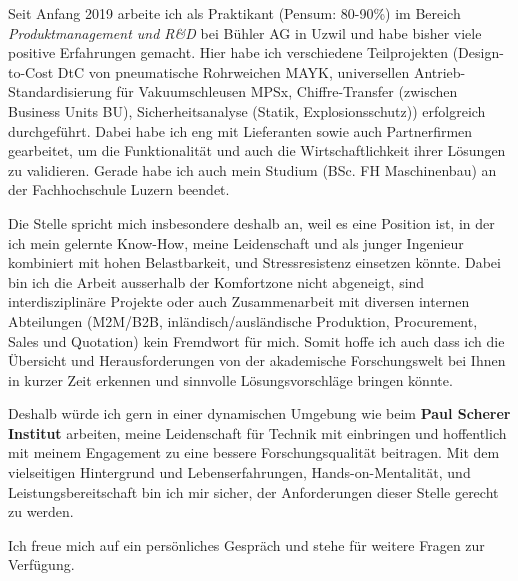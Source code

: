 \documentclass[11pt, a4paper]{awesome-cv}
\newcommand{\companyName}{Paul Scherer Institut}
\begin{document}
\makecvheader

\makelettertitle

\begin{cvletter}
	
Seit Anfang 2019 arbeite ich als Praktikant (Pensum: 80-90\%) im Bereich \textit{Produktmanagement und R\&D} bei Bühler AG in Uzwil und habe bisher viele positive Erfahrungen gemacht. Hier habe ich verschiedene Teilprojekten (Design-to-Cost DtC von pneumatische Rohrweichen MAYK, universellen Antrieb-Standardisierung für Vakuumschleusen MPSx, Chiffre-Transfer (zwischen Business Units BU), Sicherheitsanalyse (Statik, Explosionsschutz)) erfolgreich durchgeführt. Dabei habe ich eng mit Lieferanten sowie auch Partnerfirmen gearbeitet, um die Funktionalität und auch die Wirtschaftlichkeit ihrer Lösungen zu validieren. Gerade habe ich auch mein Studium (BSc. FH Maschinenbau) an der Fachhochschule Luzern beendet.

Die Stelle spricht mich insbesondere deshalb an, weil es eine Position ist, in der ich mein gelernte Know-How, meine Leidenschaft und als junger Ingenieur kombiniert mit hohen Belastbarkeit, und Stressresistenz einsetzen könnte. Dabei bin ich die Arbeit ausserhalb der Komfortzone nicht abgeneigt, sind interdisziplinäre Projekte oder auch Zusammenarbeit mit diversen internen Abteilungen (M2M/B2B, inländisch/ausländische Produktion, Procurement, Sales und Quotation) kein Fremdwort für mich. Somit hoffe ich auch dass ich die Übersicht und Herausforderungen von der akademische Forschungswelt bei Ihnen in kurzer Zeit erkennen und sinnvolle Lösungsvorschläge bringen könnte.  

Deshalb würde ich gern in einer dynamischen Umgebung wie beim \textbf{\companyName} arbeiten, meine Leidenschaft für Technik mit einbringen und hoffentlich mit meinem Engagement zu eine bessere Forschungsqualität beitragen. Mit dem vielseitigen Hintergrund und Lebenserfahrungen, Hands-on-Mentalität, und Leistungsbereitschaft bin ich mir sicher, der Anforderungen dieser Stelle gerecht zu werden. 

Ich freue mich auf ein persönliches Gespräch und stehe für weitere Fragen zur Verfügung.

\end{cvletter}

\makeletterclosing
\end{document}

